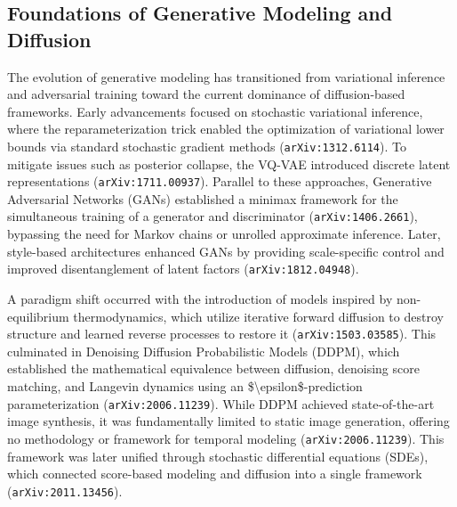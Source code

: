 \documentclass[11pt]{article}
\begin{document}
\subsection{Foundations of Generative Modeling and Diffusion}

The evolution of generative modeling has transitioned from variational inference and adversarial training toward the current dominance of diffusion-based frameworks. Early advancements focused on stochastic variational inference, where the reparameterization trick enabled the optimization of variational lower bounds via standard stochastic gradient methods (\texttt{arXiv:1312.6114}). To mitigate issues such as posterior collapse, the VQ-VAE introduced discrete latent representations (\texttt{arXiv:1711.00937}). Parallel to these approaches, Generative Adversarial Networks (GANs) established a minimax framework for the simultaneous training of a generator and discriminator (\texttt{arXiv:1406.2661}), bypassing the need for Markov chains or unrolled approximate inference. Later, style-based architectures enhanced GANs by providing scale-specific control and improved disentanglement of latent factors (\texttt{arXiv:1812.04948}).

A paradigm shift occurred with the introduction of models inspired by non-equilibrium thermodynamics, which utilize iterative forward diffusion to destroy structure and learned reverse processes to restore it (\texttt{arXiv:1503.03585}). This culminated in Denoising Diffusion Probabilistic Models (DDPM), which established the mathematical equivalence between diffusion, denoising score matching, and Langevin dynamics using an \$\textbackslash{}epsilon\$-prediction parameterization (\texttt{arXiv:2006.11239}). While DDPM achieved state-of-the-art image synthesis, it was fundamentally limited to static image generation, offering no methodology or framework for temporal modeling (\texttt{arXiv:2006.11239}). This framework was later unified through stochastic differential equations (SDEs), which connected score-based modeling and diffusion into a single framework (\texttt{arXiv:2011.13456}).
\end{document}
